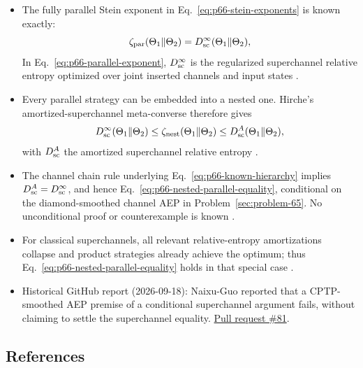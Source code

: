 \begin{itemize}
  \item The fully parallel Stein exponent in
  Eq.~\eqref{eq:p66-stein-exponents} is known exactly:
  \begin{equation}
    \zeta_{\mathrm{par}}(\Theta_1\|\Theta_2)
    =D_{\rm sc}^{\infty}(\Theta_1\|\Theta_2),
    \label{eq:p66-parallel-exponent}
  \end{equation}
  In Eq.~\eqref{eq:p66-parallel-exponent}, $D_{\rm sc}^{\infty}$ is the
  regularized superchannel relative
  entropy optimized over joint inserted channels and input states
  .

  \item Every parallel strategy can be embedded into a nested one.  Hirche's
  amortized-superchannel meta-converse therefore gives
  \begin{equation}
    D_{\rm sc}^{\infty}(\Theta_1\|\Theta_2)
    \leq\zeta_{\mathrm{nest}}(\Theta_1\|\Theta_2)
    \leq D_{\rm sc}^{A}(\Theta_1\|\Theta_2),
    \label{eq:p66-known-hierarchy}
  \end{equation}
  with $D_{\rm sc}^{A}$ the amortized superchannel relative entropy
  .

  \item The channel chain rule underlying
  Eq.~\eqref{eq:p66-known-hierarchy} implies
  $D_{\rm sc}^{A}=D_{\rm sc}^{\infty}$, and hence
  Eq.~\eqref{eq:p66-nested-parallel-equality}, conditional on the
  diamond-smoothed channel AEP in Problem~\ref{sec:problem-65}.  No
  unconditional proof or counterexample is known
  .

  \item For classical superchannels, all relevant relative-entropy
  amortizations collapse and product strategies already achieve the optimum;
  thus Eq.~\eqref{eq:p66-nested-parallel-equality} holds in that special case
  .

  \item Historical GitHub report (2026-09-18): Naixu-Guo reported that a CPTP-smoothed AEP premise of a conditional superchannel argument fails, without claiming to settle the superchannel equality. \href{https://github.com/Naixu-Guo/quantum-open-problems/pull/81}{Pull request \#81}.
\end{itemize}

\subsection*{References}

